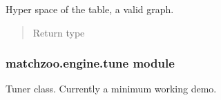 \documentclass[letterpaper,10pt,english]{sphinxmanual}
\begin{document}
\begin{fulllineitems}
\begin{fulllineitems}
\end{fulllineitems}


\begin{fulllineitems}
\label{\detokenize{matchzoo.engine:matchzoo.engine.param_table.ParamTable.hyper_space}}
 \textendash{} Hyper space of the table, a valid  graph.
\begin{quote}\begin{description}
\item[{Return type}] \leavevmode
{}

\end{description}\end{quote}

\end{fulllineitems}


\end{fulllineitems}



\subsubsection{matchzoo.engine.tune module}
\label{\detokenize{matchzoo.engine:matchzoo-engine-tune-module}}\label{\detokenize{matchzoo.engine:module-matchzoo.engine.tune}}
Tuner class. Currently a minimum working demo.
\end{document}
